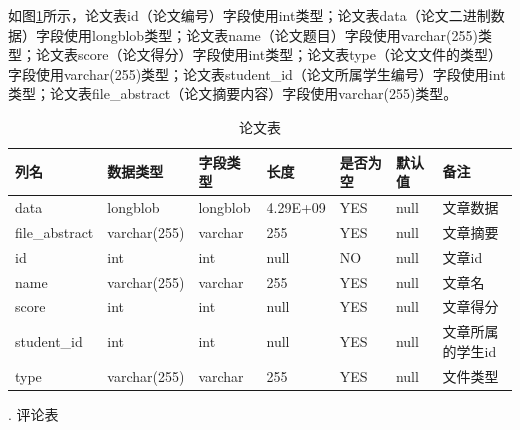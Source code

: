 如图\ref{db-file}所示，论文表id（论文编号）字段使用int类型；论文表data（论文二进制数据）字段使用longblob类型；论文表name（论文题目）字段使用varchar(255)类型；论文表score（论文得分）字段使用int类型；论文表type（论文文件的类型）字段使用varchar(255)类型；论文表student\_id（论文所属学生编号）字段使用int类型；论文表file\_abstract（论文摘要内容）字段使用varchar(255)类型。
\begin{table}[htbp]
    \centering
    \song\wuhao
    \caption{论文表}
    \label{db-file}
    \begin{tabular}{lllllll}
        \hline
        列名           & 数据类型     & 字段类型 & 长度     & 是否为空 & 默认值 & 备注             \\ \hline
        data           & longblob     & longblob & 4.29E+09 & YES      & null   & 文章数据         \\
        file\_abstract & varchar(255) & varchar  & 255      & YES      & null   & 文章摘要         \\
        id             & int          & int      & null     & NO       & null   & 文章id           \\
        name           & varchar(255) & varchar  & 255      & YES      & null   & 文章名           \\
        score          & int          & int      & null     & YES      & null   & 文章得分         \\
        student\_id    & int          & int      & null     & YES      & null   & 文章所属的学生id \\
        type           & varchar(255) & varchar  & 255      & YES      & null   & 文件类型         \\ \hline
    \end{tabular}
\end{table}

.  评论表

